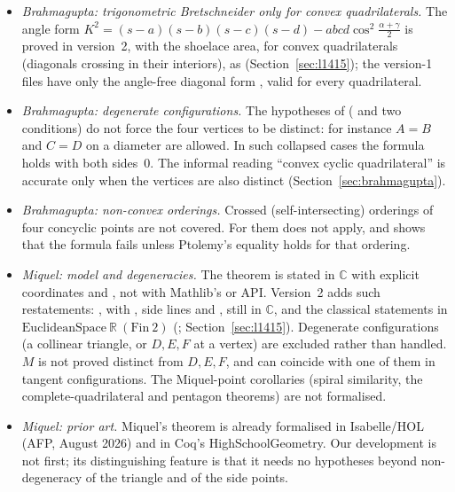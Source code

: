 \documentclass[11pt]{article}
\theoremstyle{definition}
\theoremstyle{remark}
\newcommand{\RR}{\mathbb{R}}
\newcommand{\CC}{\mathbb{C}}
\begin{document}
\begin{itemize}
hypothesis (Section~\ref{sec:l1415}).
\item \emph{Brahmagupta: trigonometric Bretschneider only for convex quadrilaterals.} The angle form
$K^2=(s-a)(s-b)(s-c)(s-d)-abcd\cos^2\tfrac{\alpha+\gamma}2$ is proved in version~2, with the shoelace
area, for convex quadrilaterals (diagonals crossing in their interiors), as
 (Section~\ref{sec:l1415}); the version-1 files
have only the angle-free diagonal form , valid for every
quadrilateral.
\item \emph{Brahmagupta: degenerate configurations.} The hypotheses of
 ( and two  conditions) do not force the
four vertices to be distinct: for instance $A=B$ and $C=D$ on a diameter are allowed. In such
collapsed cases the formula holds with both sides~$0$. The informal reading ``convex cyclic
quadrilateral'' is accurate only when the vertices are also distinct (Section~\ref{sec:brahmagupta}).
\item \emph{Brahmagupta: non-convex orderings.} Crossed (self-intersecting) orderings of four
concyclic points are not covered. For them  does not apply, and
 shows that the formula fails unless Ptolemy's equality
holds for that ordering.
\item \emph{Miquel: model and degeneracies.} The theorem is stated in $\CC$ with explicit
coordinates and , not with Mathlib's  or
 API. Version~2 adds such restatements:
, with , side lines and , still in
$\CC$, and the classical statements in $\mathrm{EuclideanSpace}\ \RR\ (\mathrm{Fin}\ 2)$
(; Section~\ref{sec:l1415}).
Degenerate configurations (a collinear triangle, or $D,E,F$ at a vertex) are excluded rather than
handled. $M$ is not proved distinct from $D,E,F$, and can coincide with one of them in tangent
configurations. The Miquel-point corollaries (spiral similarity, the complete-quadrilateral and
pentagon theorems) are not formalised.
\item \emph{Miquel: prior art.} Miquel's theorem is already formalised in Isabelle/HOL (AFP,
August 2026) and in Coq's HighSchoolGeometry. Our development is not first; its distinguishing
feature is that it needs no hypotheses beyond non-degeneracy of the triangle and of the side points.

\end{itemize}
\end{document}
